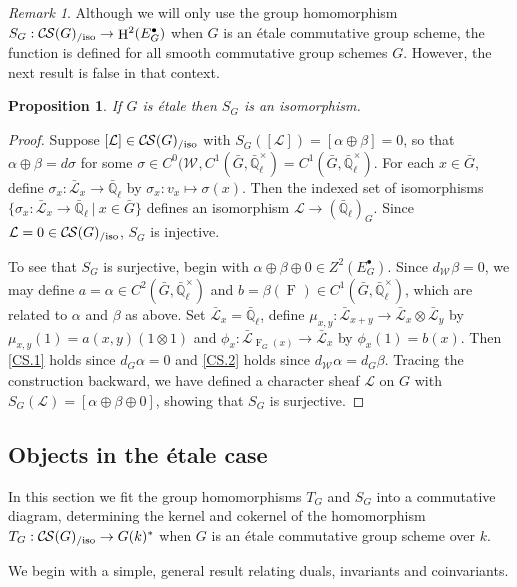 \documentclass[10pt]{amsart}
\theoremstyle{plain}
\newtheorem{proposition}[theorem]{Proposition}
\theoremstyle{definition}
\theoremstyle{remark}
\newtheorem{remark}[theorem]{Remark}
\newcommand{\EE}{\mathbb{\bar Q}_\ell}
\newcommand{\Fq}{k}
\newcommand{\EEx}{\EE^\times}
\newcommand{\Weil}[1]{\mathcal{W}_{#1}}
\newcommand{\Frob}[1]{\operatorname{F}_{#1}}
\DeclareMathOperator{\Hh}{H}
\newcommand{\tq}{{\ \vert\ }}
\newcommand{\TrFrob}[1]{T_{#1}}
\newcommand{\cs}[1]{{\mathcal{#1}}}
\newcommand{\gcs}[1]{{\mathcal{\bar #1}}}
\newcommand{\CS}{{\mathcal{C\hskip-0.8pt S}}}
\newcommand{\CSiso}[1]{\CS(#1)_{/\text{iso}}}
\begin{document}
\begin{remark}
Although we will only use the group homomorphism $S_G : \CSiso{G}\to \Hh^2(E^\bullet_G)$ when $G$ is an \'etale commutative group scheme, the function is defined for all smooth commutative group schemes $G$.
However, the next result is false in that context.
\end{remark}

\begin{proposition}\label{prop:SGiso}
If $G$ is \'etale then $S_G$ is an isomorphism.
\end{proposition}
\begin{proof}
Suppose $[\cs{L}] \in \CSiso{G}$ with $S_G([\cs{L}]) = [\alpha \oplus \beta] = 0$,
so that $\alpha \oplus \beta = d\sigma$ for some $\sigma \in C^0(\Weil{},C^1({\bar G},\EEx) = C^1({\bar G},\EEx)$.
For each $x\in {\bar G}$, define $\sigma_x : \gcs{L}_x \to \EE$ by $\sigma_x : v_x \mapsto \sigma(x)$.
Then the indexed set of isomorphisms $\{ \sigma_x : \gcs{L}_x \to \EE \tq x\in {\bar G}\}$
defines an isomorphism $\cs{L} \to (\EE)_G$.
Since $\cs{L} = 0 \in \CSiso{G}$, $S_G$ is injective.

To see that $S_G$ is surjective, begin with $\alpha\oplus\beta\oplus 0 \in Z^2(E^\bullet_G)$.
Since $d_{\Weil{}} \beta = 0$, we may define $a = \alpha \in C^2({\bar G},\EEx)$ and
$b = \beta(\Frob{}) \in C^1({\bar G},\EEx)$, which are related to $\alpha$ and $\beta$ as above.
Set $\gcs{L}_x = \EE$, define $\mu_{x,y} : \gcs{L}_{x+y} \to \gcs{L}_x\otimes\gcs{L}_y$
by $\mu_{x,y}(1) = a(x,y) (1\otimes 1)$ and $\phi_x : \gcs{L}_{\Frob{G}(x)} \to \gcs{L}_x$ by $\phi_x(1)= b(x)$.
Then \ref{CS.1} holds since $d_G \alpha =0$ and \ref{CS.2} holds since $d_{\Weil{}}\alpha =d_G \beta$.
Tracing the construction backward, we have defined a character sheaf $\cs{L}$ on $G$ with
$S_G(\cs{L}) = [\alpha\oplus\beta\oplus 0]$, showing that $S_G$ is surjective.
\end{proof}

\subsection{Objects in the \'etale case}\label{ssec:SandT}

In this section we fit the group homomorphisms $\TrFrob{G}$ and $S_G$ into a commutative diagram, determining the kernel and cokernel of the homomorphism $\TrFrob{G} : \CSiso{G} \to G(k)^*$ when $G$ is an \'etale commutative group scheme over $\Fq$.

%
We begin with a simple, general result relating duals, invariants and coinvariants.
\end{document}
